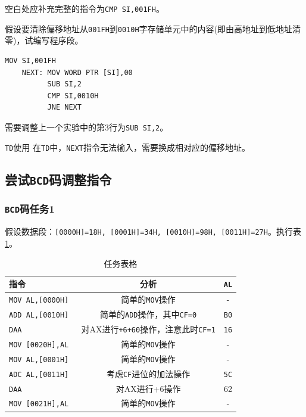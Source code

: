 \documentclass[11pt]{SEU-Digital-Report}
\newcommand{\grayrow}{\rowcolor[rgb]{ .906, .902, .902}}
\begin{document}
空白处应补充完整的指令为\texttt{CMP SI,001FH}。

假设要清除偏移地址从\texttt{001FH}到\texttt{0010H}字存储单元中的内容(即由高地址到低地址清零)，试编写程序段。
\begin{lstlisting}[language={[x86masm]Assembler},title=code]
          MOV SI,001FH
    NEXT: MOV WORD PTR [SI],00
          SUB SI,2
          CMP SI,0010H
          JNE NEXT
\end{lstlisting}

需要调整上一个实验中的第3行为\texttt{SUB SI,2}。

\begin{note}{\texttt{TD}使用}{}
    在\texttt{TD}中，\texttt{NEXT}指令无法输入，需要换成相对应的偏移地址。
\end{note}

\subsection{尝试\texttt{BCD}码调整指令}
\subsubsection{\texttt{BCD}码任务1}
假设数据段：\texttt{[0000H]=18H, [0001H]=34H, [0010H]=98H, [0011H]=27H}。执行表 \ref{tab:task6.1}。
\begin{table}[htbp]
    \centering
    \caption{任务表格\label{tab:task6.1}}
    \bgroup{}
    \setlength{\tabcolsep}{4.5mm}
        \begin{tabular}{l|c|c}
          \toprule
          \textbf{指令} & \textbf{分析} & \texttt{AL}\\
          \midrule\midrule
          \grayrow  \texttt{MOV AL,[0000H]} & 简单的\texttt{MOV}操作 & -\\
                    \texttt{ADD AL,[0010H] } & 简单的\texttt{ADD}操作，其中\texttt{CF=0} & \texttt{B0}\\
          \grayrow  \texttt{DAA} & 对AX进行\texttt{+6+60}操作，注意此时\texttt{CF=1} & \texttt{16}\\
                    \texttt{MOV [0020H],AL}& 简单的\texttt{MOV}操作 & -\\
          \grayrow  \texttt{MOV AL,[0001H]} & 简单的\texttt{MOV}操作 & -\\
                    \texttt{ADC AL,[0011H]} & 考虑\texttt{CF}进位的加法操作 & \texttt{5C}\\
          \grayrow  \texttt{DAA} & 对AX进行+6操作 & 62\\
                    \texttt{MOV [0021H],AL} &简单的\texttt{MOV}操作 & -\\
          \bottomrule
        \end{tabular}
    \egroup
\end{table}
\end{document}
